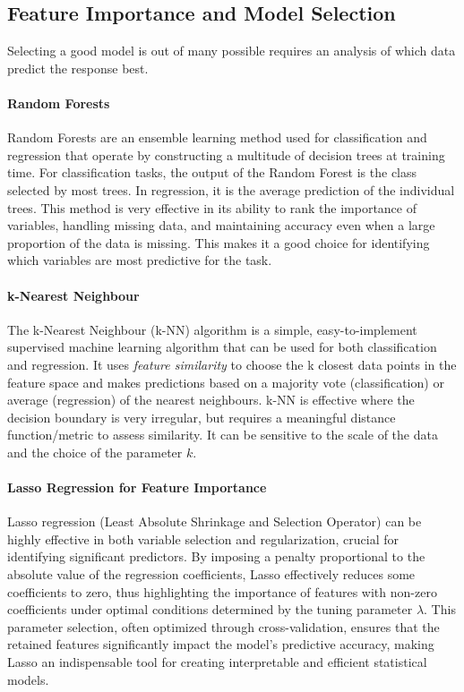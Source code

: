 \documentclass[12pt, twoside,hidelinks]{article}
\theoremstyle{definition}
\numberwithin{equation}{section}
\begin{document}
\subsection{Feature Importance and Model Selection}
Selecting a good model is out of many possible requires an analysis of which data predict the response best. 


\paragraph{Random Forests}
Random Forests are an ensemble learning method used for classification and regression that operate by constructing a multitude of decision trees at training time. For classification tasks, the output of the Random Forest is the class selected by most trees. In regression, it is the average prediction of the individual trees. This method is very effective in its ability to rank the importance of variables, handling missing data, and maintaining accuracy even when a large proportion of the data is missing. This makes it a good choice for identifying which variables are most predictive for the task. 

\paragraph{k-Nearest Neighbour}
The k-Nearest Neighbour (k-NN) algorithm is a simple, easy-to-implement supervised machine learning algorithm that can be used for both classification and regression. It uses \textit{feature similarity} to choose the k closest data points in the feature space and makes predictions based on a majority vote (classification) or average (regression) of the nearest neighbours. k-NN is effective where the decision boundary is very irregular, but requires a meaningful distance function/metric to assess similarity. It can be sensitive to the scale of the data and the choice of the parameter \( k \).

\paragraph{Lasso Regression for Feature Importance}
Lasso regression (Least Absolute Shrinkage and Selection Operator) can be highly effective in both variable selection and regularization, crucial for identifying significant predictors. By imposing a penalty proportional to the absolute value of the regression coefficients, Lasso effectively reduces some coefficients to zero, thus highlighting the importance of features with non-zero coefficients under optimal conditions determined by the tuning parameter \( \lambda \). This parameter selection, often optimized through cross-validation, ensures that the retained features significantly impact the model's predictive accuracy, making Lasso an indispensable tool for creating interpretable and efficient statistical models.
\end{document}
